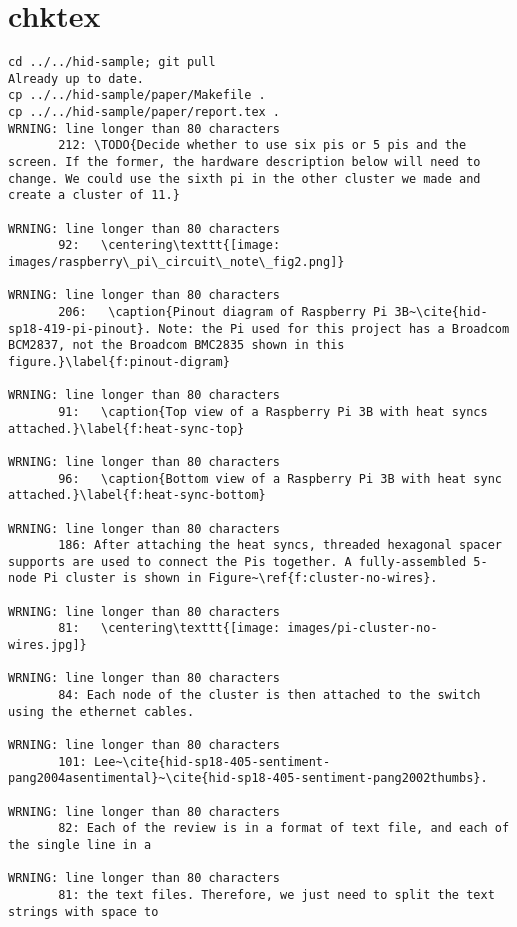 \appendix
\section{chktex}
\begin{tiny}
\begin{verbatim}
cd ../../hid-sample; git pull
Already up to date.
cp ../../hid-sample/paper/Makefile .
cp ../../hid-sample/paper/report.tex .
WRNING: line longer than 80 characters
       212: \TODO{Decide whether to use six pis or 5 pis and the screen. If the former, the hardware description below will need to change. We could use the sixth pi in the other cluster we made and create a cluster of 11.}

WRNING: line longer than 80 characters
       92:   \centering\texttt{[image: images/raspberry\_pi\_circuit\_note\_fig2.png]}

WRNING: line longer than 80 characters
       206:   \caption{Pinout diagram of Raspberry Pi 3B~\cite{hid-sp18-419-pi-pinout}. Note: the Pi used for this project has a Broadcom BCM2837, not the Broadcom BMC2835 shown in this figure.}\label{f:pinout-digram}

WRNING: line longer than 80 characters
       91:   \caption{Top view of a Raspberry Pi 3B with heat syncs attached.}\label{f:heat-sync-top}

WRNING: line longer than 80 characters
       96:   \caption{Bottom view of a Raspberry Pi 3B with heat sync attached.}\label{f:heat-sync-bottom}

WRNING: line longer than 80 characters
       186: After attaching the heat syncs, threaded hexagonal spacer supports are used to connect the Pis together. A fully-assembled 5-node Pi cluster is shown in Figure~\ref{f:cluster-no-wires}.

WRNING: line longer than 80 characters
       81:   \centering\texttt{[image: images/pi-cluster-no-wires.jpg]}

WRNING: line longer than 80 characters
       84: Each node of the cluster is then attached to the switch using the ethernet cables. 

WRNING: line longer than 80 characters
       101: Lee~\cite{hid-sp18-405-sentiment-pang2004asentimental}~\cite{hid-sp18-405-sentiment-pang2002thumbs}.

WRNING: line longer than 80 characters
       82: Each of the review is in a format of text file, and each of the single line in a 

WRNING: line longer than 80 characters
       81: the text files. Therefore, we just need to split the text strings with space to 


\end{verbatim}
\end{tiny}
